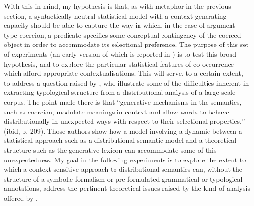 With this in mind, my hypothesis is that, as with metaphor in the previous section, a syntactically neutral statistical model with a context generating capacity should be able to capture the way in which, in the case of argument type coercion, a predicate specifies some conceptual contingency of the coerced object in order to accommodate its selectional preference.  The purpose of this set of experiments (an early version of which is reported in \cite{McGregorEA2017}) is to test this broad hypothesis, and to explore the particular statistical features of co-occurrence which afford appropriate contextualisations.  This will serve, to a certain extent, to address a question raised by \cite{PustejovskyEA2008}, who illustrate some of the difficulties inherent in extracting typological structure from a distributional analysis of a large-scale corpus.  The point made there is that ``generative mechanisms in the semantics, such as coercion, modulate meanings in context and allow words to behave distributionally in unexpected ways with respect to their selectional properties,'' (ibid, p. 209).  Those authors show how a model involving a dynamic between a statistical approach such as a distributional semantic model and a theoretical structure such as the generative lexicon can accommodate some of this unexpectedness.  My goal in the following experiments is to explore the extent to which a context sensitive approach to distributional semantics can, without the structure of a symbolic formalism or pre-formulated grammatical or typological annotations, address the pertinent theoretical issues raised by the kind of analysis offered by \citeauthor{PustejovskyEA2008}.

